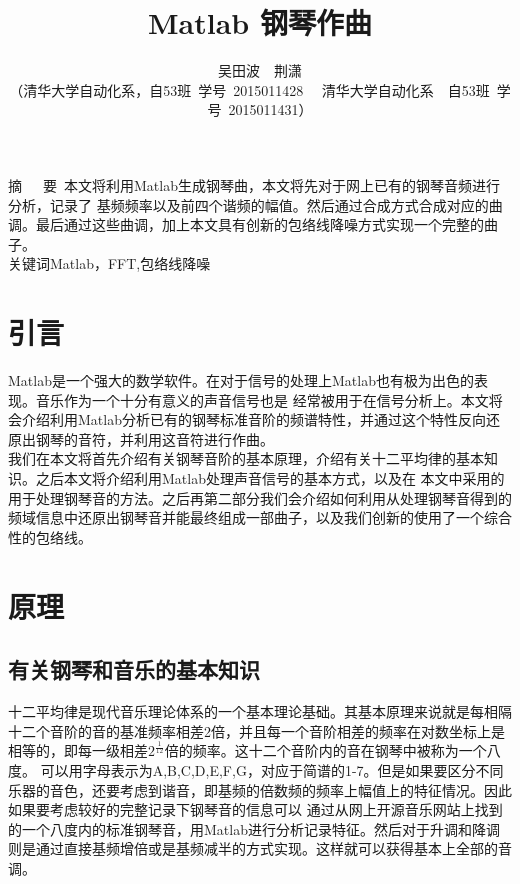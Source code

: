 \documentclass[a4paper,11pt,onecolumn,twoside]{article}
\title{\huge{Matlab 钢琴作曲}}
\author{吴田波~~荆潇\\[2pt]
\normalsize
（清华大学自动化系，自53班~学号~2015011428 ~~清华大学自动化系~~自53班~学号~2015011431） \\[2pt]}
\date{}
\begin{document}
\begin{CJK*}{UTF8}{gbsn}
\newcommand{\supercite}[1]{\textsuperscript{\cite{#1}}}
\maketitle

\setlength{\oddsidemargin}{ 1cm}  %
\setlength{\evensidemargin}{\oddsidemargin}
\setlength{\textwidth}{13.50cm}
\vspace{-.8cm}
\begin{center}
\parbox{\textwidth}{
摘~~~要\quad {}~本文将利用Matlab生成钢琴曲，本文将先对于网上已有的钢琴音频进行分析，记录了
基频频率以及前四个谐频的幅值。然后通过合成方式合成对应的曲调。最后通过这些曲调，加上本文具有创新的包络线降噪方式实现一个完整的曲子。\\
关键词\quad{}Matlab，FFT,包络线降噪\\}
\end{center}

\setlength{\oddsidemargin}{-.5cm}  %
\setlength{\evensidemargin}{\oddsidemargin}
\setlength{\textwidth}{17.00cm}
\begin{multicols}{2}
\section{引言}
\indent Matlab是一个强大的数学软件。在对于信号的处理上Matlab也有极为出色的表现。音乐作为一个十分有意义的声音信号也是
经常被用于在信号分析上。本文将会介绍利用Matlab分析已有的钢琴标准音阶的频谱特性，并通过这个特性反向还原出钢琴的音符，并利用这音符进行作曲。\\
\indent 我们在本文将首先介绍有关钢琴音阶的基本原理，介绍有关十二平均律的基本知识。之后本文将介绍利用Matlab处理声音信号的基本方式，以及在
本文中采用的用于处理钢琴音的方法。之后再第二部分我们会介绍如何利用从处理钢琴音得到的频域信息中还原出钢琴音并能最终组成一部曲子，以及我们创新的使用了一个综合性的包络线。\\
\section{原理}


\subsection{有关钢琴和音乐的基本知识}

\normalsize
\indent 十二平均律是现代音乐理论体系的一个基本理论基础。其基本原理来说就是每相隔十二个音阶的音的基准频率相差2倍，并且每一个音阶相差的频率在对数坐标上是相等的，即每一级相差$2^{\frac{1}{12}}$倍的频率。这十二个音阶内的音在钢琴中被称为一个八度。
可以用字母表示为A,B,C,D,E,F,G，对应于简谱的1-7。但是如果要区分不同乐器的音色，还要考虑到谐音，即基频的倍数频的频率上幅值上的特征情况。因此如果要考虑较好的完整记录下钢琴音的信息可以
通过从网上开源音乐网站上找到的一个八度内的标准钢琴音，用Matlab进行分析记录特征。然后对于升调和降调则是通过直接基频增倍或是基频减半的方式实现。这样就可以获得基本上全部的音调。


\end{multicols}
\end{CJK*}
\end{document}
